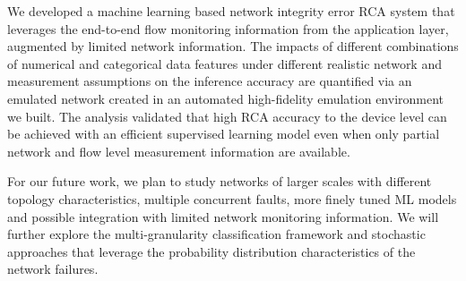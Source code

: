 We developed a machine learning based network integrity error RCA system that leverages the end-to-end flow monitoring information 
from the application layer, augmented by limited network information. The impacts of different combinations of numerical and categorical data 
features under different realistic network and measurement assumptions on the inference accuracy are quantified via an emulated network created 
in an automated high-fidelity emulation environment we built. The analysis validated that high RCA accuracy to the device level can be achieved with an efficient supervised 
learning model even when only partial network and flow level measurement information are available.

For our future work, we plan to study networks of larger scales with different topology characteristics, multiple concurrent faults, more finely tuned ML models and possible integration with limited network monitoring information.
We will further explore the multi-granularity classification framework and stochastic approaches that leverage the probability distribution characteristics of the network failures.
